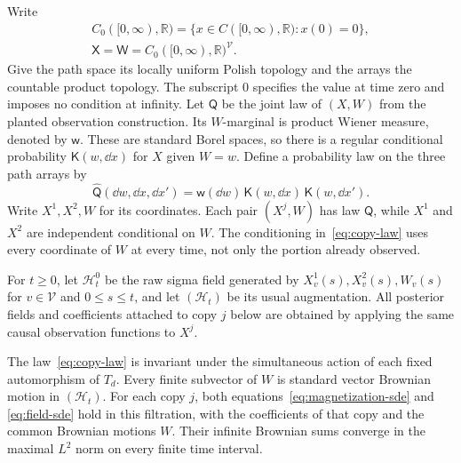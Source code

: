 Write
\[
 \begin{gathered}
 C_0([0,\infty),\mathbb R)
   =\{x\in C([0,\infty),\mathbb R):x(0)=0\},\\
 \mathsf X=\mathsf W=C_0([0,\infty),\mathbb R)^{\mathcal V}.
 \end{gathered}
\]
Give the path space its locally uniform Polish topology and the arrays
the countable product topology. The subscript $0$ specifies the value
at time zero and imposes no condition at infinity.
Let $\mathsf Q$ be the joint law of $(X,W)$ from the
planted observation construction. Its $W$-marginal is product Wiener
measure, denoted by $\mathsf w$. These are standard Borel spaces, so
there is a regular conditional probability $\mathsf K(w,\dd x)$ for
$X$ given $W=w$. Define a probability law on the three path arrays by
\begin{equation}\label{eq:copy-law}
 \widehat{\mathsf Q}(\dd w,\dd x,\dd x')
   =\mathsf w(\dd w)\,\mathsf K(w,\dd x)\,\mathsf K(w,\dd x').
\end{equation}
Write $X^1,X^2,W$ for its coordinates. Each pair $(X^j,W)$ has law
$\mathsf Q$, while $X^1$ and $X^2$ are independent conditional on
$W$. The conditioning in~\eqref{eq:copy-law} uses every coordinate
of $W$ at every time, not only the portion already observed.

For $t\ge0$, let $\mathcal H_t^0$ be the raw sigma field generated by
$X^1_v(s),X^2_v(s),W_v(s)$ for $v\in\mathcal V$ and $0\le s\le t$,
and let $(\mathcal H_t)$ be its usual augmentation. All posterior
fields and coefficients attached to copy $j$ below are obtained by
applying the same causal observation functions to $X^j$.

\begin{proposition}
\label{prop:compatible-copies}
The law~\eqref{eq:copy-law} is invariant under the simultaneous
action of each fixed automorphism of $T_d$. Every finite subvector of
$W$ is standard vector Brownian motion in $(\mathcal H_t)$. For each
copy $j$, both equations~\eqref{eq:magnetization-sde} and
\eqref{eq:field-sde} hold in this filtration, with the coefficients
of that copy and the common Brownian motions $W$. Their infinite
Brownian sums converge in the maximal $L^2$ norm on every finite
time interval.
\end{proposition}

